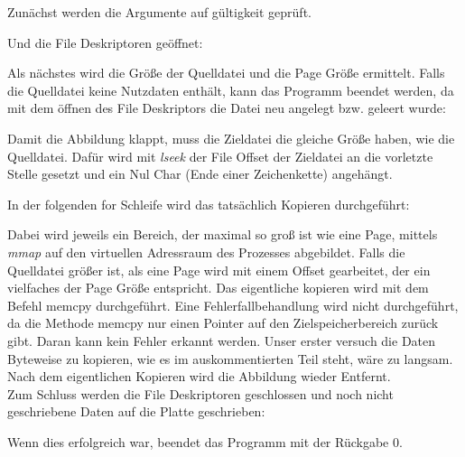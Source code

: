 \documentclass{ti2}
\begin{document}
Zunächst werden die Argumente auf gültigkeit geprüft. 

Und die File Deskriptoren geöffnet: 

Als nächstes wird die Größe der Quelldatei und die Page Größe ermittelt. Falls die Quelldatei keine Nutzdaten enthält, kann das Programm beendet werden, da mit dem öffnen des File Deskriptors die Datei neu angelegt bzw. geleert wurde:

Damit die Abbildung klappt, muss die Zieldatei die gleiche Größe haben, wie die Quelldatei. Dafür wird mit \textit{lseek} der File Offset der Zieldatei an die vorletzte Stelle gesetzt und ein Nul Char (Ende einer Zeichenkette) angehängt. 

In der folgenden for Schleife wird das tatsächlich Kopieren durchgeführt: 

Dabei wird jeweils ein Bereich, der maximal so groß ist wie eine Page, mittels \textit{mmap} auf den virtuellen Adressraum des Prozesses abgebildet. Falls die Quelldatei größer ist, als eine Page wird mit einem Offset gearbeitet, der ein vielfaches der Page Größe entspricht. Das eigentliche kopieren wird mit dem Befehl memcpy durchgeführt. Eine Fehlerfallbehandlung wird nicht durchgeführt, da die Methode memcpy nur einen Pointer auf den Zielspeicherbereich zurück gibt. Daran kann kein Fehler erkannt werden. Unser erster versuch die Daten Byteweise zu kopieren, wie es im auskommentierten Teil steht, wäre zu langsam. \\
Nach dem eigentlichen Kopieren wird die Abbildung wieder Entfernt. \\
Zum Schluss werden die File Deskriptoren geschlossen und noch nicht geschriebene Daten auf die Platte geschrieben:

Wenn dies erfolgreich war, beendet das Programm mit der Rückgabe 0. 
\end{document}
